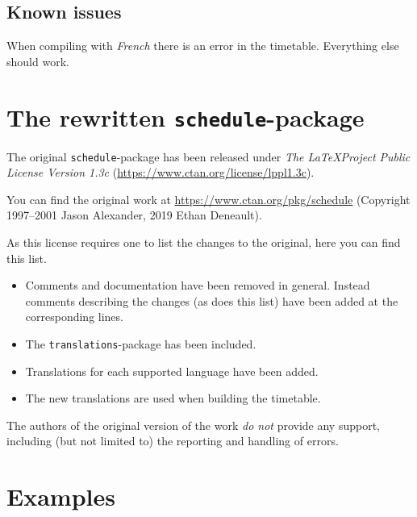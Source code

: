 \documentclass[english]{article}
\begin{document}
	\subsection{Known issues}
	When compiling with \emph{French} there is an error in the timetable. Everything else should work.
	
	\pagebreak
	\section{The rewritten \texttt{schedule}-package}
	The original \texttt{schedule}-package has been released under \textit{The \LaTeX Project Public License Version 1.3c} (\url{https://www.ctan.org/license/lppl1.3c}).
	
	\noindent You can find the original work at \url{https://www.ctan.org/pkg/schedule} (Copyright 1997–2001 Jason Alexander, 
	2019 Ethan Deneault).
	
	\noindent As this license requires one to list the changes to the original, here you can find this list.
	\begin{itemize}
		\item 
		Comments and documentation have been removed in general. Instead comments describing the changes (as does this list) have been added at the corresponding lines.
		
		\item
		The \texttt{translations}-package has been included.
		
		\item
		Translations for each supported language have been added.
		
		\item
		The new translations are used when building the timetable.
	\end{itemize}

	\noindent
	The authors of the original version of the work \textit{do not} provide any support, including (but not limited to) the reporting and handling of errors.
	
	\pagebreak
	\section{Examples}
\end{document}
